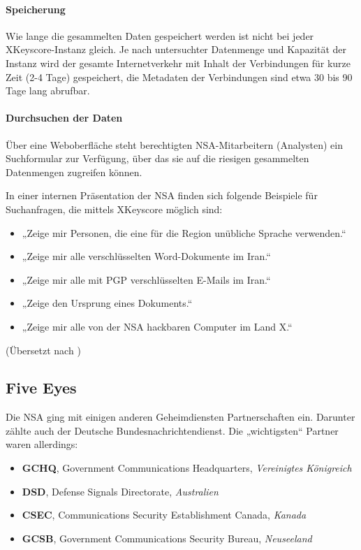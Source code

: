 \documentclass[12pt,a4paper]{scrartcl}
\begin{document}
\paragraph{Speicherung}
Wie lange die gesammelten Daten gespeichert werden ist nicht bei jeder XKeyscore-Instanz gleich. Je nach untersuchter Datenmenge und Kapazität der Instanz wird der gesamte Internetverkehr mit Inhalt der Verbindungen für kurze Zeit (2-4 Tage) gespeichert, die Metadaten der Verbindungen sind etwa 30 bis 90 Tage lang abrufbar.\cite{nsa_xkeyscore}

\paragraph{Durchsuchen der Daten}
Über eine Weboberfläche steht berechtigten NSA-Mitarbeitern (Analysten) ein Suchformular zur Verfügung, über das sie auf die riesigen gesammelten Datenmengen zugreifen können.

In einer internen Präsentation der NSA finden sich folgende Beispiele für Suchanfragen, die mittels XKeyscore möglich sind:

\begin{itemize}
\item „Zeige mir Personen, die eine für die Region unübliche Sprache verwenden.“
\item „Zeige mir alle verschlüsselten Word-Dokumente im Iran.“
\item „Zeige mir alle mit PGP verschlüsselten E-Mails im Iran.“
\item „Zeige den Ursprung eines Dokuments.“
\item „Zeige mir alle von der NSA hackbaren Computer im Land X.“
\end{itemize}
(Übersetzt nach \cite{nsa_xkeyscore})

\subsection{Five Eyes}
Die NSA ging mit einigen anderen Geheimdiensten Partnerschaften ein. Darunter zählte auch der Deutsche Bundesnachrichtendienst.\cite{zeit_partner} Die „wichtigsten“ Partner waren allerdings:
\begin{itemize}
\item \textbf{GCHQ}, Government Communications Headquarters, \emph{Vereinigtes Königreich}
\item \textbf{DSD}, Defense Signals Directorate, \emph{Australien}
\item \textbf{CSEC}, Communications Security Establishment Canada, \emph{Kanada}
\item \textbf{GCSB}, Government Communications Security Bureau, \emph{Neuseeland}
\end{itemize}\cite{wiki_ukusa}
\end{document}
